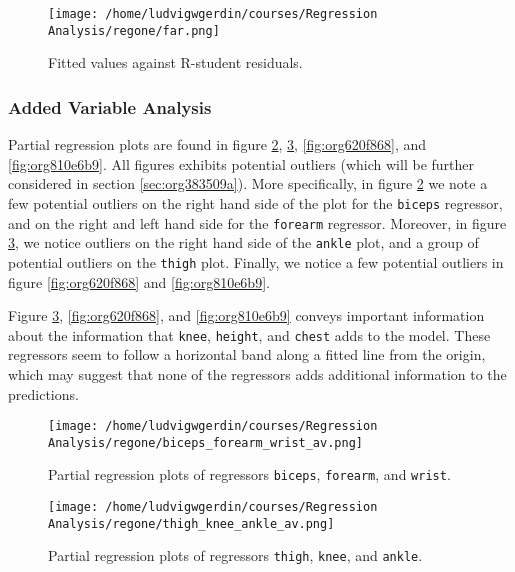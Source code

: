 \documentclass[11pt]{article}
\begin{document}
\begin{figure}[htbp]
\centering
\texttt{[image: /home/ludvigwgerdin/courses/Regression Analysis/regone/far.png]}
\caption{\label{fig:org9539cf3}
Fitted values against R-student residuals.}
\end{figure}

\subsubsection{Added Variable Analysis}
\label{sec:org3cbde36}

Partial regression plots are found in figure \ref{fig:org735ba5e}, \ref{fig:orgbebeaa5},
\ref{fig:org620f868}, and \ref{fig:org810e6b9}. All figures exhibits potential outliers 
(which will be further considered in section \ref{sec:org383509a}).
More specifically, in figure \ref{fig:org735ba5e} we note a 
few potential outliers on the right hand side of the plot for the \texttt{biceps} regressor, and on the
right and left hand side for the \texttt{forearm} regressor. Moreover, in figure \ref{fig:orgbebeaa5}, we 
notice outliers on the right hand side of the \texttt{ankle} plot, and a group of potential outliers on the
\texttt{thigh} plot. Finally, we notice a few potential outliers in figure \ref{fig:org620f868} and 
\ref{fig:org810e6b9}.

Figure \ref{fig:orgbebeaa5}, \ref{fig:org620f868}, and \ref{fig:org810e6b9} 
conveys important information about the information that \texttt{knee}, \texttt{height}, and
\texttt{chest} adds to the model. These regressors seem to follow a horizontal band along a fitted 
line from the origin, which may suggest that none of the regressors adds additional information 
to the predictions.

\begin{figure}[htbp]
\centering
\texttt{[image: /home/ludvigwgerdin/courses/Regression Analysis/regone/biceps\_forearm\_wrist\_av.png]}
\caption{\label{fig:org735ba5e}
Partial regression plots of regressors \texttt{biceps}, \texttt{forearm}, and \texttt{wrist}.}
\end{figure}   

\begin{figure}[htbp]
\centering
\texttt{[image: /home/ludvigwgerdin/courses/Regression Analysis/regone/thigh\_knee\_ankle\_av.png]}
\caption{\label{fig:orgbebeaa5}
Partial regression plots of regressors \texttt{thigh}, \texttt{knee}, and \texttt{ankle}.}
\end{figure}
\end{document}
